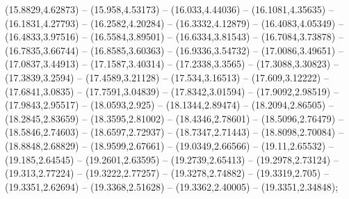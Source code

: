 {  (15.8829,4.62873) -- (15.958,4.53173) -- (16.033,4.44036) -- (16.1081,4.35635) -- (16.1831,4.27793) -- (16.2582,4.20284) -- (16.3332,4.12879) -- (16.4083,4.05349) -- (16.4833,3.97516) -- (16.5584,3.89501) -- (16.6334,3.81543) -- (16.7084,3.73878) --
  (16.7835,3.66744) -- (16.8585,3.60363) -- (16.9336,3.54732) -- (17.0086,3.49651) -- (17.0837,3.44913) -- (17.1587,3.40314) -- (17.2338,3.3565) -- (17.3088,3.30823) -- (17.3839,3.2594) -- (17.4589,3.21128) -- (17.534,3.16513) -- (17.609,3.12222) --
  (17.6841,3.0835) -- (17.7591,3.04839) -- (17.8342,3.01594) -- (17.9092,2.98519) -- (17.9843,2.95517) -- (18.0593,2.925) -- (18.1344,2.89474) -- (18.2094,2.86505) -- (18.2845,2.83659) -- (18.3595,2.81002) -- (18.4346,2.78601) -- (18.5096,2.76479) --
  (18.5846,2.74603) -- (18.6597,2.72937) -- (18.7347,2.71443) -- (18.8098,2.70084) -- (18.8848,2.68829) -- (18.9599,2.67661) -- (19.0349,2.66566) -- (19.11,2.65532) -- (19.185,2.64545) -- (19.2601,2.63595) -- (19.2739,2.65413) -- (19.2978,2.73124) --
  (19.313,2.77224) -- (19.3222,2.77257) -- (19.3278,2.74882) -- (19.3319,2.705) -- (19.3351,2.62694) -- (19.3368,2.51628) -- (19.3362,2.40005) -- (19.3351,2.34848);

}
